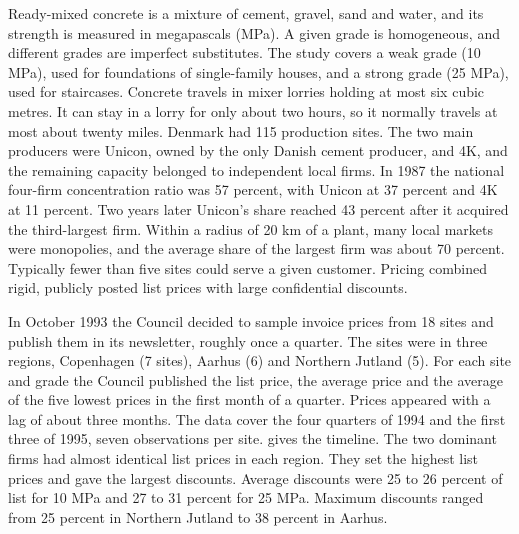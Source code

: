 Ready-mixed concrete is a mixture of cement, gravel, sand and water, and its strength is measured in megapascals
(MPa). A given grade is homogeneous, and different grades are imperfect substitutes. The study covers a weak grade
(10 MPa), used for foundations of single-family houses, and a strong grade (25 MPa), used for staircases.
Concrete travels in mixer lorries holding at most six cubic metres. It can stay in a lorry for only about two hours,
so it normally travels at most about twenty miles. Denmark had 115 production sites. The two main producers were
Unicon, owned by the only Danish cement producer, and 4K, and the remaining capacity belonged to independent
local firms. In 1987 the national four-firm concentration ratio was 57 percent, with Unicon at 37 percent and 4K
at 11 percent. Two years later Unicon's share reached 43 percent after it acquired the third-largest firm. Within
a radius of 20 km of a plant, many local markets were monopolies, and the average share of the largest firm was
about 70 percent. Typically fewer than five sites could serve a given customer. Pricing combined rigid, publicly
posted list prices with large confidential discounts.

In October 1993 the Council decided to sample invoice prices from 18 sites and publish them in its newsletter,
roughly once a quarter. The sites were in three regions, Copenhagen (7 sites), Aarhus (6) and Northern Jutland
(5). For each site and grade the Council published the list price, the average price and the average of the five
lowest prices in the first month of a quarter. Prices appeared with a lag of about three months. The data cover
the four quarters of 1994 and the first three of 1995, seven observations per site. 
gives the timeline. The two dominant firms had almost identical list prices in each region. They set the highest
list prices and gave the largest discounts. Average discounts were 25 to 26 percent of list for 10 MPa and 27 to
31 percent for 25 MPa. Maximum discounts ranged from 25 percent in Northern Jutland to 38 percent in Aarhus.

